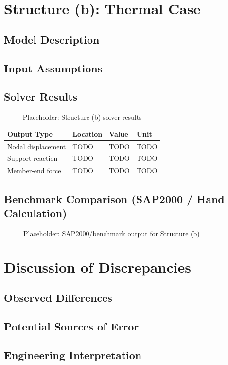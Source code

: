 \section{Structure (b): Thermal Case}
\subsection{Model Description}

\subsection{Input Assumptions}

\subsection{Solver Results}
\begin{table}[H]
    \centering
    \caption{Placeholder: Structure (b) solver results}
    \label{tab:structure_b_results}
    \begin{tabular}{llll}
        \toprule
        Output Type & Location & Value & Unit \\
        \midrule
        Nodal displacement & TODO & TODO & TODO \\
        Support reaction & TODO & TODO & TODO \\
        Member-end force & TODO & TODO & TODO \\
        \bottomrule
    \end{tabular}
\end{table}

\subsection{Benchmark Comparison (SAP2000 / Hand Calculation)}
\begin{figure}[H]
    \centering
    \caption{Placeholder: SAP2000/benchmark output for Structure (b)}
    \label{fig:structure_b_benchmark}
\end{figure}

\section{Discussion of Discrepancies}
\subsection{Observed Differences}

\subsection{Potential Sources of Error}

\subsection{Engineering Interpretation}
